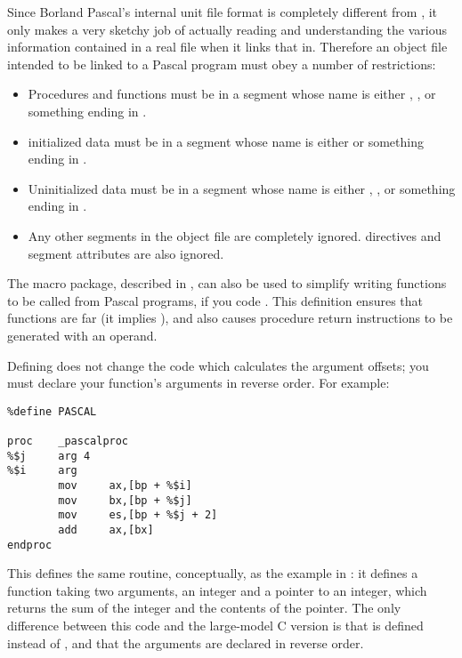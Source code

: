 Since Borland Pascal's internal unit file format is completely
different from , it only makes a very sketchy job of actually
reading and understanding the various information contained in a
real  file when it links that in. Therefore an object file
intended to be linked to a Pascal program must obey a number of
restrictions:

\begin{itemize}
    \item{Procedures and functions must be in a segment whose name is
        either , , or something ending in
        .}

    \item{initialized data must be in a segment whose name is either
         or something ending in .}

    \item{Uninitialized data must be in a segment whose name is either
        , , or something ending in .}

    \item{Any other segments in the object file are completely ignored.
         directives and segment attributes are also ignored.}
\end{itemize}


The  macro package, described in ,
can also be used to simplify writing functions to be called from Pascal
programs, if you code . This
definition ensures that functions are far (it implies ),
and also causes procedure return instructions to be generated with
an operand.

Defining  does not change the code which calculates the
argument offsets; you must declare your function's arguments in
reverse order. For example:

\begin{lstlisting}
%define PASCAL

proc    _pascalproc
%$j     arg 4
%$i     arg
        mov     ax,[bp + %$i]
        mov     bx,[bp + %$j]
        mov     es,[bp + %$j + 2]
        add     ax,[bx]
endproc
\end{lstlisting}

This defines the same routine, conceptually, as the example in
: it defines a function taking two arguments,
an integer and a pointer to an integer, which returns the sum of
the integer and the contents of the pointer. The only difference
between this code and the large-model C version is that 
is defined instead of , and that the arguments are
declared in reverse order.
